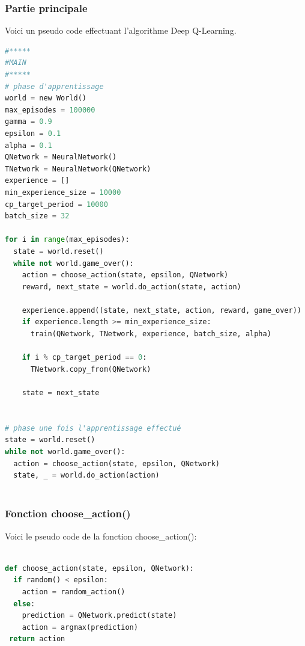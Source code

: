 \documentclass[11pt,a4paper]{report}
\begin{document}
   \subsubsection{Partie principale}
   
   \par Voici un pseudo code effectuant l'algorithme Deep Q-Learning. 
   
   \begin{lstlisting}[language=python]
#*****
#MAIN
#*****
# phase d'apprentissage
world = new World()
max_episodes = 100000
gamma = 0.9
epsilon = 0.1
alpha = 0.1
QNetwork = NeuralNetwork()
TNetwork = NeuralNetwork(QNetwork)
experience = []
min_experience_size = 10000
cp_target_period = 10000
batch_size = 32
  
for i in range(max_episodes):
  state = world.reset()
  while not world.game_over():
    action = choose_action(state, epsilon, QNetwork)
    reward, next_state = world.do_action(state, action)

    experience.append((state, next_state, action, reward, game_over)) 
    if experience.length >= min_experience_size:
      train(QNetwork, TNetwork, experience, batch_size, alpha)

    if i % cp_target_period == 0:
      TNetwork.copy_from(QNetwork)
        
    state = next_state
    
        
# phase une fois l'apprentissage effectué
state = world.reset()
while not world.game_over():
  action = choose_action(state, epsilon, QNetwork)
  state, _ = world.do_action(action)
        
  \end{lstlisting} 

   \subsubsection{Fonction choose\_action()}

   \par Voici le pseudo code de la fonction choose\_action():  
  
  \begin{lstlisting}[language=python]
  
def choose_action(state, epsilon, QNetwork):
  if random() < epsilon:
    action = random_action()
  else:
    prediction = QNetwork.predict(state)
    action = argmax(prediction)
 return action
 
  \end{lstlisting} 
  
\end{document}
